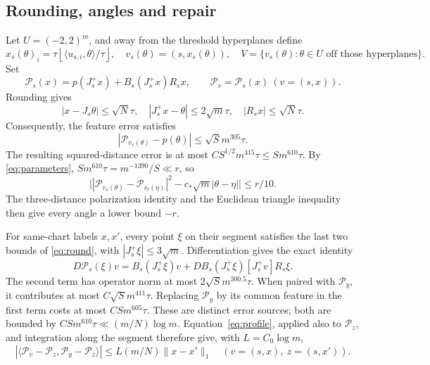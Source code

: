 \documentclass[11pt]{article}
\theoremstyle{remark}\newtheorem{remark}[theorem]{Remark}
\numberwithin{equation}{section}
\newcommand{\ip}[2]{\langle #1,#2\rangle}
\newcommand{\norm}[1]{\lVert #1\rVert}
\begin{document}
\subsection{Rounding, angles and repair}
Let $U=(-2,2)^m$, and away from the threshold hyperplanes define
\[
 x_s(\theta)_i=\tau\left\lfloor\ip{u_{s,i}}\theta/\tau\right\rfloor,
 \quad v_s(\theta)=(s,x_s(\theta)),\quad
 V=\{v_s(\theta):\theta\in U\text{ off those hyperplanes}\}.
\]
Set
\[
 \mathcal P_s(x)=p(J_s^+x)+B_s(J_s^+x)R_sx,
 \qquad \mathcal P_v=\mathcal P_s(x)\ (v=(s,x)).
\]
Rounding gives
\begin{equation}\label{eq:round}
 |x-J_s\theta|\le\sqrt N\tau,\quad
 |J_s^+x-\theta|\le2\sqrt m\tau,\quad
 |R_sx|\le\sqrt N\tau.
\end{equation}
Consequently, the feature error satisfies
\[
 |\mathcal P_{v_s(\theta)}-p(\theta)|\le\sqrt S m^{305}\tau.
\]
The resulting squared-distance error is at most
$CS^{1/2}m^{415}\tau\le S m^{610}\tau$. By \eqref{eq:parameters},
$S m^{610}\tau=m^{-1390}/S\ll r$, so
\begin{equation}\label{eq:rounded}
 \big||\mathcal P_{v_s(\theta)}-\mathcal P_{v_t(\eta)}|^2
       -c_*\sqrt m|\theta-\eta|\big|\le r/10.
\end{equation}
The three-distance polarization identity and the Euclidean triangle
inequality then give every angle a lower bound $-r$.

For same-chart labels $x,x'$, every point $\xi$ on their segment satisfies
the last two bounds of \eqref{eq:round}, with $|J_s^+\xi|\le3\sqrt m$.
Differentiation gives the exact identity
\begin{equation}\label{eq:DP}
 D\mathcal P_s(\xi)v
 =B_s(J_s^+\xi)v+DB_s(J_s^+\xi)[J_s^+v]R_s\xi.
\end{equation}
The second term has operator norm at most $2\sqrt S m^{300.5}\tau$.
When paired with $\mathcal P_y$, it contributes at most
$C\sqrt S m^{411}\tau$. Replacing $\mathcal P_y$ by its common feature
in the first term costs at most $CSm^{605}\tau$. These are distinct error
sources; both are bounded by $CSm^{610}\tau\ll(m/N)\log m$.
Equation~\eqref{eq:profile}, applied also to $\mathcal P_z$, and integration
along the segment therefore give, with $L=C_0\log m$,
\begin{equation}\label{eq:angle}
 |\ip{\mathcal P_v-\mathcal P_z}{\mathcal P_y-\mathcal P_z}|
 \le L(m/N)\norm{x-x'}_1
 \quad(v=(s,x),\ z=(s,x')).
\end{equation}
\end{document}
